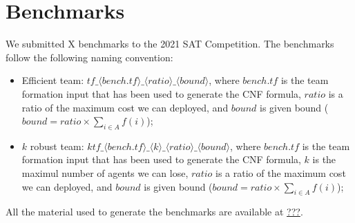 \documentclass[conference]{IEEEtran}
\theoremstyle{definition}
\begin{document}
\section{Benchmarks}

We submitted X benchmarks to the 2021 SAT Competition.
The benchmarks follow the following naming convention:
\begin{itemize}
\item Efficient team: $tf\_\langle bench.tf \rangle \_\langle ratio \rangle\_\langle bound \rangle$, 
where $bench.tf$ is the team formation input that has been used to generate the CNF formula,
$ratio$ is a ratio of the maximum cost we can deployed, and $bound$ is given bound 
($bound = ratio \times \sum_{i \in A} f(i)$);
\item $k$ robust team: $ktf\_\langle bench.tf \rangle \_\langle k \rangle\_\langle ratio \rangle\_\langle bound \rangle$, where $bench.tf$ is the team formation input that has been used to generate the CNF formula,
$k$ is the maximul number of agents we can lose,
$ratio$ is a ratio of the maximum cost we can deployed, and $bound$ is given bound 
($bound = ratio \times \sum_{i \in A} f(i)$);
\end{itemize}

All the material used to generate the benchmarks are available at \url{???}.


 

\end{document}

